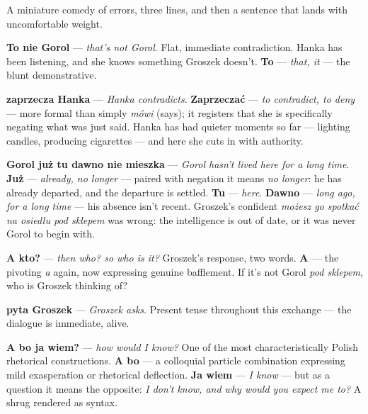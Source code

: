 

A miniature comedy of errors, three lines, and then a sentence
that lands with uncomfortable weight.

\textbf{To nie Gorol} --- \textit{that's not Gorol}. Flat,
immediate contradiction. Hanka has been listening, and she knows
something Groszek doesn't. \textbf{To} --- \textit{that, it}
--- the blunt demonstrative.

\textbf{zaprzecza Hanka} --- \textit{Hanka contradicts}.
\textbf{Zaprzeczać} --- \textit{to contradict, to deny} --- more
formal than simply \textit{mówi} (says); it registers that she
is specifically negating what was just said. Hanka has had
quieter moments so far --- lighting candles, producing
cigarettes --- and here she cuts in with authority.

\textbf{Gorol już tu dawno nie mieszka} --- \textit{Gorol hasn't
lived here for a long time}. \textbf{Już} --- \textit{already,
no longer} --- paired with negation it means \textit{no longer}:
he has already departed, and the departure is settled.
\textbf{Tu} --- \textit{here}. \textbf{Dawno} --- \textit{long
ago, for a long time} --- his absence isn't recent. Groszek's
confident \textit{możesz go spotkać na osiedlu pod sklepem} was
wrong: the intelligence is out of date, or it was never Gorol
to begin with.

\textbf{A kto?} --- \textit{then who? so who is it?} Groszek's
response, two words. \textbf{A} --- the pivoting \textit{a}
again, now expressing genuine bafflement. If it's not Gorol
\textit{pod sklepem}, who is Groszek thinking of?

\textbf{pyta Groszek} --- \textit{Groszek asks}. Present tense
throughout this exchange --- the dialogue is immediate, alive.

\textbf{A bo ja wiem?} --- \textit{how would I know?} One of
the most characteristically Polish rhetorical constructions.
\textbf{A bo} --- a colloquial particle combination expressing
mild exasperation or rhetorical deflection. \textbf{Ja wiem}
--- \textit{I know} --- but as a question it means the opposite:
\textit{I don't know, and why would you expect me to?} A shrug
rendered as syntax.

